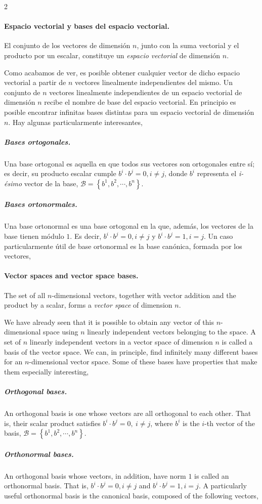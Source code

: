 \begin{paracol}{2}
\paragraph{Espacio vectorial y  bases del espacio vectorial.} El conjunto de los vectores de dimensión $n$, junto con la suma vectorial y el producto por un escalar, constituye  un  \emph{espacio vectorial} de dimensión $n$.

 Como acabamos de ver, es posible obtener cualquier vector de dicho espacio vectorial a partir de $n$ vectores linealmente independientes del mismo. Un conjunto de $n$ vectores linealmente independientes de un espacio vectorial de dimensión $n$ recibe el nombre de base del espacio vectorial. En principio es posible encontrar infinitas bases distintas para un espacio vectorial de dimensión $n$. Hay algunas particularmente interesantes,
 
 \subparagraph{Bases ortogonales.} Una base ortogonal es aquella en que todos sus vectores son ortogonales entre sí; es decir, su producto escalar cumple $b^i\cdot b^j=0, i\neq j$, donde $b^i$ representa el \emph{i-ésimo} vector de la base, $\mathcal{B}=\left\lbrace b^1, b^2, \cdots, b^n  \right\rbrace $.
 
 \subparagraph{Bases ortonormales.} Una base ortonormal es una base ortogonal en la que, además, los vectores de la base tienen módulo $1$. Es decir, $b^i\cdot b^j=0, i\neq j$ y  $b^i\cdot b^j=1, i = j$. Un caso particularmente útil de base ortonormal es la base canónica, formada por los vectores, 
\switchcolumn
\paragraph{Vector spaces and vector space bases.} 

The set of all $n$-dimensional vectors, together with vector addition and the product by a scalar, forms a \emph{vector space} of dimension $n$.

 We have already seen that it is possible to obtain any vector of this $n$-dimensional space using $n$ linearly independent vectors belonging to the space. A set of $n$ linearly independent vectors in a vector space of dimension $n$ is called a basis of the vector space. We can, in principle, find infinitely many different bases for an $n$-dimensional vector space. Some of these bases have properties that make them especially interesting,
 
 \subparagraph{Orthogonal bases.} An orthogonal basis is one whose vectors are all orthogonal to each other. That is, their scalar product satisfies $b^i\cdot b^j =0,\ i \neq j$, where $b^i$ is the $i$-th vector of the basis, $\mathcal{B} =\left\lbrace b^1,b^2,\cdots,b^n \right\rbrace$.

\subparagraph{Orthonormal bases.} An orthogonal basis whose vectors, in addition, have norm $1$ is called an orthonormal basis. That is, $b^i\cdot b^j=0, i\neq j$ and $b^i\cdot b^j=1, i = j$. A particularly useful orthonormal basis is the canonical basis, composed of the following vectors, 
\end{paracol}

